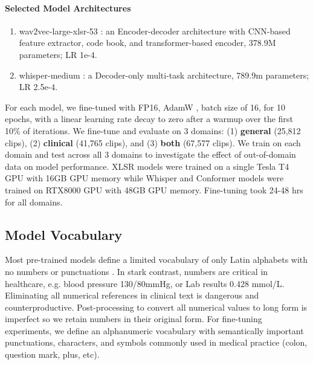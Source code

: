\documentclass[11pt,a4paper]{article}
\begin{document}
\paragraph{Selected Model Architectures}
\begin{enumerate}[leftmargin=0.4cm, noitemsep]
    \item wav2vec-large-xlsr-53 \citep{grosman2021xlsr53-large-english}: an Encoder-decoder architecture with CNN-based feature extractor, code book, and transformer-based encoder, 378.9M parameters; LR 1e-4.
    \item whisper-medium \citep{radford2022robust}: a Decoder-only multi-task architecture, 789.9m parameters; LR 2.5e-4.
\end{enumerate}

For each model, we fine-tuned with FP16, AdamW \citep{loshchilov2017decoupled}, batch size of 16, for 10 epochs, with a linear learning rate decay to zero after a warmup over
the first 10\% of iterations. We fine-tune and evaluate on 3 domains: (1) \textbf{general} (25,812 clips), (2) \textbf{clinical} (41,765 clips), and (3) \textbf{both} (67,577 clips). We train on each domain and test across all 3 domains to investigate the effect of out-of-domain data on model performance. XLSR models were trained on a single Tesla T4 GPU with 16GB GPU memory while Whisper and Conformer models were trained on RTX8000 GPU with 48GB GPU memory. Fine-tuning took 24-48 hrs for all domains.

\subsection{Model Vocabulary}
\label{model_vocabulary}
 Most pre-trained models define a limited vocabulary of only Latin alphabets with no numbers or punctuations \citep{Baevski2020wav2vec2A}. In stark contrast, numbers are critical in healthcare, e.g. blood pressure 130/80mmHg, or Lab results 0.428 mmol/L. Eliminating all numerical references in clinical text is dangerous and counterproductive. Post-processing to convert all numerical values to long form is imperfect so we retain numbers in their original form. For fine-tuning experiments, we define an alphanumeric vocabulary with semantically important punctuations, characters, and symbols commonly used in medical practice (colon, question mark, plus, etc). 
\end{document}
